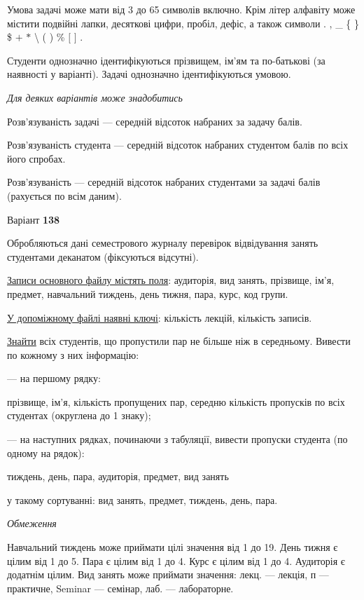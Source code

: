 \documentclass[11pt, ukrainian]{article}
\begin{document}
Умова задачі може мати від 3 до 65 символів включно.
Крім літер алфавіту може містити подвійні лапки, десяткові цифри, пробіл, дефіс,
а також символи . , \_ \{ \} \$ $+$ $*$ {\textbackslash} ( ) \% $[$ $]$ .

Студенти однозначно ідентифікуються прізвищем, ім’ям та по-батькові (за наявності у варіанті).
Задачі однозначно ідентифікуються умовою.

\bigskip\textit{Для деяких варіантів може знадобитись}

Розв'язуваність задачі --- середній відсоток набраних за задачу балів.

Розв'язуваність студента --- середній відсоток набраних студентом балів по всіх його спробах.

Розв'язуваність --- середній відсоток набраних студентами за задачі балів (рахується по всім даним).




\par
\newpage

{\center Варіант  \No \textbf { 138 }\par}
\bigskip
Обробляються дані семестрового журналу перевірок відвідування занять студентами деканатом (фіксуються відсутні). 

\underline{Записи основного файлу містять поля}: аудиторія, вид занять, прізвище, ім’я, предмет, навчальний тиждень, день тижня, пара, курс, код групи.

\underline{У допоміжному файлі наявні ключі}: кількість лекцій, кількість записів.

\underline{Знайти} всіх студентів, що пропустили пар не більше ніж в середньому. Вивести по кожному з них інформацію:\par
{\noindent}--- на першому рядку:\par
прізвище, ім’я, кількість пропущених пар, середню кількість пропусків по всіх студентах (округлена до 1 знаку);

{\noindent}--- на наступних рядках, починаючи з табуляції, вивести пропуски студента (по одному на рядок):\par
тиждень, день, пара, аудиторія, предмет, вид занять

{\noindent}у такому сортуванні: вид занять, предмет, тиждень, день, пара.


\bigskip\textit{Обмеження}

Навчальний тиждень може приймати цілі значення від 1 до 19.
День тижня є цілим від 1 до 5. Пара є цілим від 1 до 4.
Курс є цілим від 1 до 4. Аудиторія є додатнім цілим.
Вид занять може приймати значення:
лекц. --- лекція, п --- практичне, Seminar --- семінар, лаб. --- лабораторне.
\end{document}
